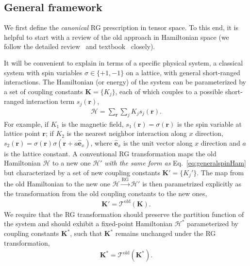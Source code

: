 \documentclass[aps,prr,reprint,superscriptaddress,nofootinbib,floatfix]{revtex4-2}
\begin{document}
\subsection{General framework\label{RGprescrip}}
We first define the \textit{canonical} RG prescription in tensor space.
To this end, it is helpful to start with a review of the old approach in Hamiltonian space (we follow the detailed review~\cite{kadanoff2014} and textbook~\cite{cardy_1996} closely).
%

It will be convenient to explain in terms of a specific physical system, a classical system with spin variables $\sigma \in \{+1, -1\}$ on a lattice, with general short-ranged interactions.
The Hamiltonian (or energy) of the system can be parameterized by a set of coupling constants $\mathbf{K} = \{K_j\}$, each of which couples to a possible short-ranged interaction term $s_j(\mathbf{r})$,
%
\begin{align}\label{eq:generalspinHam}
    \mathcal{H} = \sum_{\mathbf{r}} \sum_{j} K_j s_j(\mathbf{r}).
\end{align}
%
For example, if $K_1$ is the magnetic field, $s_1(\mathbf{r}) = \sigma(\mathbf{r})$ is the spin variable at lattice point $\mathbf{r}$; if $K_2$ is the nearest neighbor interaction along $x$ direction, $s_2(\mathbf{r}) = \sigma(\mathbf{r})\sigma(\mathbf{r} + a\hat{\mathbf{e}}_x)$, where $\hat{\mathbf{e}}_x$ is the unit vector along $x$ direction and $a$ is the lattice constant. 
A conventional RG transformation maps the old Hamiltonian $\mathcal{H}$ to a new one $\mathcal{H}'$ \textit{with the same form as} Eq.~\eqref{eq:generalspinHam} but characterized by a set of new coupling constants $\mathbf{K}' = \{ K_j'\}$. 
The map from the old Hamiltonian to the new one $\mathcal{H} \xrightarrow{\text{RG}} \mathcal{H}'$ is then parametrized explicitly as the transformation from the old coupling constants to the new ones,
%
\begin{align}\label{eq:oldRGK}
    \mathbf{K}' = \mathcal{T}^{\text{old}}\left(\mathbf{K}\right).
\end{align}
%
We require that the RG transformation should preserve the partition function of the system and should exhibit a fixed-point Hamiltonian $\mathcal{H}^{*}$ parameterized by coupling constants $\mathbf{K}^{*}$, such that $\mathbf{K}^{*}$ remains unchanged under the RG transformation,
%
\begin{align}\label{eq:oldRGKstar}
    \mathbf{K}^{*} =
    \mathcal{T}^{\text{old}}\left(\mathbf{K}^{*}\right).
\end{align}
%
\end{document}
